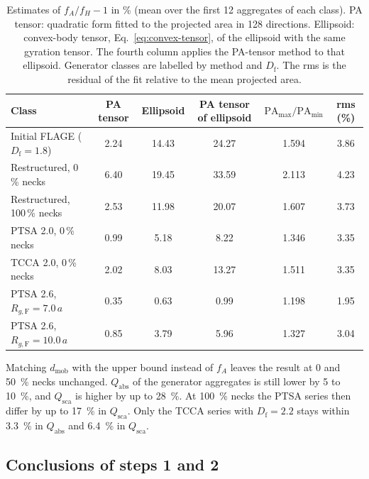 \documentclass[11pt,a4paper]{article}
\newcommand{\Df}{D_\text{f}}
\begin{document}
\begin{table}[htbp]
  \centering
  \caption{Estimates of $f_A/f_H - 1$ in \% (mean over the first 12 aggregates of each class).
  PA tensor: quadratic form fitted to the projected area in 128 directions.
  Ellipsoid: convex-body tensor, Eq.~\eqref{eq:convex-tensor}, of the ellipsoid with the same gyration tensor.
  The fourth column applies the PA-tensor method to that ellipsoid.
  Generator classes are labelled by method and $\Df$.
  The rms is the residual of the fit relative to the mean projected area.}
  \label{tab:fa-fh}
  \small
  \setlength{\tabcolsep}{5pt}
  \begin{tabular}{lccccc}
    \toprule
    Class & PA tensor & Ellipsoid & PA tensor of ellipsoid & $\text{PA}_\text{max}/\text{PA}_\text{min}$ & rms (\%) \\
    \midrule
    Initial FLAGE ($\Df = 1.8$) & 2.24 & 14.43 & 24.27 & 1.594 & 3.86 \\
    Restructured, 0\,\% necks & 6.40 & 19.45 & 33.59 & 2.113 & 4.23 \\
    Restructured, 100\,\% necks & 2.53 & 11.98 & 20.07 & 1.607 & 3.73 \\
    PTSA 2.0, 0\,\% necks & 0.99 & 5.18 & 8.22 & 1.346 & 3.35 \\
    TCCA 2.0, 0\,\% necks & 2.02 & 8.03 & 13.27 & 1.511 & 3.35 \\
    PTSA 2.6, $R_{g,\text{F}} = 7.0\,a$ & 0.35 & 0.63 & 0.99 & 1.198 & 1.95 \\
    PTSA 2.6, $R_{g,\text{F}} = 10.0\,a$ & 0.85 & 3.79 & 5.96 & 1.327 & 3.04 \\
    \bottomrule
  \end{tabular}
\end{table}

Matching $d_\text{mob}$ with the upper bound instead of $f_A$ leaves the result at 0 and \SI{50}{\percent} necks unchanged.
$Q_\text{abs}$ of the generator aggregates is still lower by 5 to \SI{10}{\percent}, and $Q_\text{sca}$ is higher by up to \SI{28}{\percent}.
At \SI{100}{\percent} necks the PTSA series then differ by up to \SI{17}{\percent} in $Q_\text{sca}$.
Only the TCCA series with $\Df = 2.2$ stays within \SI{3.3}{\percent} in $Q_\text{abs}$ and \SI{6.4}{\percent} in $Q_\text{sca}$.

\subsection{Conclusions of steps 1 and 2}
\label{sec:shape-conclusions}
\end{document}
